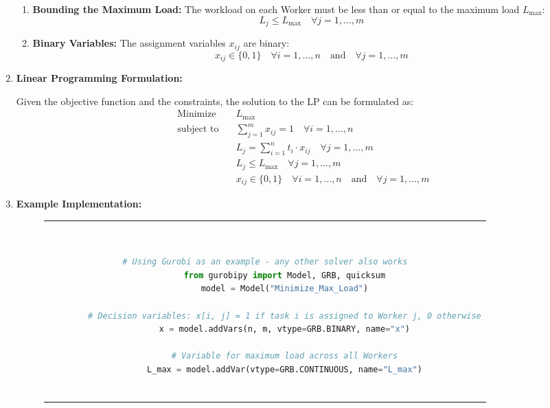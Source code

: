 \begin{enumerate}
\begin{enumerate}
    \item \textbf{Bounding the Maximum Load:} The workload on each Worker must be less than or equal to the maximum load \( L_{\text{max}} \):
    \begin{equation}
    L_j \leq L_{\text{max}} \quad \forall j = 1, \dots, m
    \end{equation}
    
    \item \textbf{Binary Variables:} The assignment variables \( x_{ij} \) are binary:
    \begin{equation}
    x_{ij} \in \{0, 1\} \quad \forall i = 1, \dots, n \quad \text{and} \quad \forall j = 1, \dots, m
    \end{equation}
\end{enumerate}

\item \textbf{Linear Programming Formulation:}

Given the objective function and the constraints, the solution to the \ac{LP} can be formulated as:
\begin{align}
\text{Minimize} \quad & L_{\text{max}} \\
\text{subject to} \quad & \sum_{j=1}^{m} x_{ij} = 1 \quad \forall i = 1, \dots, n \\
& L_j = \sum_{i=1}^{n} t_i \cdot x_{ij} \quad \forall j = 1, \dots, m \\
& L_j \leq L_{\text{max}} \quad \forall j = 1, \dots, m \\
& x_{ij} \in \{0, 1\} \quad \forall i = 1, \dots, n \quad \text{and} \quad \forall j = 1, \dots, m
\end{align}
\item \textbf{Example Implementation:} 

    \begin{figure}[htpb]
      \begin{tabular}{c}
      \ \small \begin{lstlisting}[language=Python]
        # Using Gurobi as an example - any other solver also works
        from gurobipy import Model, GRB, quicksum
        model = Model("Minimize_Max_Load")
        
        # Decision variables: x[i, j] = 1 if task i is assigned to Worker j, 0 otherwise
        x = model.addVars(n, m, vtype=GRB.BINARY, name="x")
        
        # Variable for maximum load across all Workers
        L_max = model.addVar(vtype=GRB.CONTINUOUS, name="L_max")
        

\end{lstlisting}
\end{tabular}
\end{figure}
\end{enumerate}
